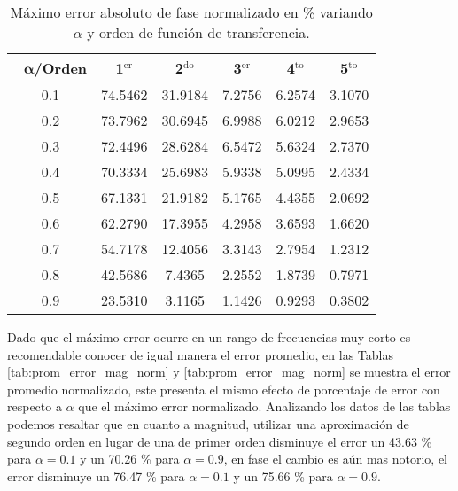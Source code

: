 \begin{table}[!hbp]                                 
\centering            
\caption{Máximo error absoluto de fase normalizado en \% variando $\alpha$ y orden de función de transferencia.}                           
\label{tab:max_error_fase_norm}                               
\begin{tabular}{cccccc}
\hline                                             
$\,\,\,\,\bm{\alpha}$\textbf{/Orden} & \textbf{1$^{\mathrm{er}}$} & \textbf{2$^{\mathrm{do}}$} & \textbf{3$^{\mathrm{er}}$} & \textbf{4$^{\mathrm{to}}$} & \textbf{5$^{\mathrm{to}}$} \\                     
\hline                                             
0.1 & 74.5462 & 31.9184 & 7.2756 & 6.2574 & 3.1070 \\
                                             
0.2 & 73.7962 & 30.6945 & 6.9988 & 6.0212 & 2.9653 \\
                                             
0.3 & 72.4496 & 28.6284 & 6.5472 & 5.6324 & 2.7370 \\
                                             
0.4 & 70.3334 & 25.6983 & 5.9338 & 5.0995 & 2.4334 \\
                                             
0.5 & 67.1331 & 21.9182 & 5.1765 & 4.4355 & 2.0692 \\
                                              
0.6 & 62.2790 & 17.3955 & 4.2958 & 3.6593 & 1.6620 \\
                                              
0.7 & 54.7178 & 12.4056 & 3.3143 & 2.7954 & 1.2312 \\
                                               
0.8 & 42.5686 & 7.4365 & 2.2552 & 1.8739 & 0.7971 \\ 
                                              
0.9 & 23.5310 & 3.1165 & 1.1426 & 0.9293 & 0.3802 \\ 
\hline                                             
\end{tabular}                                                             
\end{table}

Dado que el máximo error ocurre en un rango de frecuencias muy corto es recomendable conocer de igual manera el error promedio, en las Tablas \ref{tab:prom_error_mag_norm} y \ref{tab:prom_error_mag_norm} se muestra el error promedio normalizado, este presenta el mismo efecto de porcentaje de error con respecto a $\alpha$ que el máximo error normalizado. Analizando los datos de las tablas podemos resaltar que en cuanto a magnitud, utilizar una aproximación de segundo orden en lugar de una de primer orden disminuye el error un 43.63 \% para $\alpha = 0.1$ y un 70.26 \% para $\alpha = 0.9$, en fase el cambio es aún mas notorio, el error disminuye un 76.47 \% para $\alpha = 0.1$ y un 75.66 \% para $\alpha = 0.9$.

